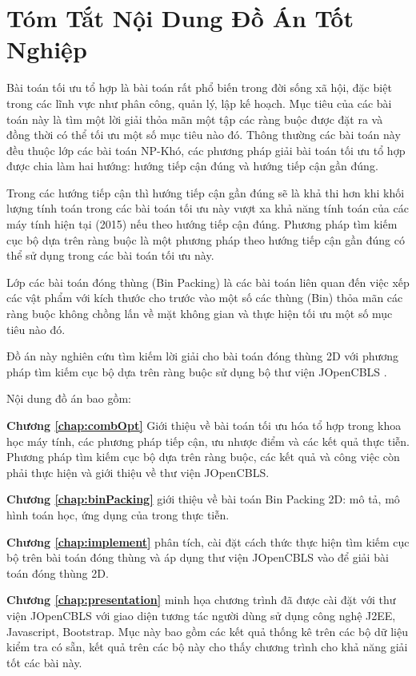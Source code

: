 \chapter*{Tóm Tắt Nội Dung Đồ Án Tốt Nghiệp}
Bài toán tối ưu tổ hợp là bài toán rất phổ biến trong đời sống xã hội, đặc biệt trong các lĩnh vực như phân công, quản lý, lập kế hoạch. Mục tiêu của các bài toán này là tìm một lời giải thỏa mãn một tập các ràng buộc được đặt ra và đồng thời có thể tối ưu một số mục tiêu nào đó. Thông thường các bài toán này đều thuộc lớp các bài toán NP-Khó, các phương pháp giải bài toán tối ưu tổ hợp được chia làm hai hướng: hướng tiếp cận đúng và hướng tiếp cận gần đúng.

Trong các hướng tiếp cận thì hướng tiếp cận gần đúng sẽ là khả thi hơn khi khối lượng tính toán trong các bài toán tối ưu này vượt xa khả năng tính toán của các máy tính hiện tại (2015) nếu theo hướng tiếp cận đúng. Phương pháp tìm kiếm cục bộ dựa trên ràng buộc là một phương pháp theo hướng tiếp cận gần đúng có thể sử dụng trong các bài toán tối ưu này.

Lớp các bài toán đóng thùng (Bin Packing) \cite{hopper2000twodimensional, lodi1999heuristic, ortmann2010newimpro, prisinger2005thetwod} là các bài toán liên quan đến việc xếp các vật phẩm với kích thước cho trước vào một số các thùng (Bin) thỏa mãn các ràng buộc không chồng lấn về mặt không gian và thực hiện tối ưu một số mục tiêu nào đó.

Đồ án này nghiên cứu tìm kiếm lời giải cho bài toán đóng thùng 2D với phương pháp tìm kiếm cục bộ dựa trên ràng buộc \cite{rossi2006handbookOfCp, pascal2005cp} sử dụng bộ thư viện JOpenCBLS \cite{dungpq2015cbls}.

Nội dung đồ án bao gồm:

\textbf{Chương \ref{chap:combOpt}} Giới thiệu về bài toán tối ưu hóa tổ hợp trong khoa học máy tính, các phương pháp tiếp cận, ưu nhược điểm và các kết quả thực tiễn. Phương pháp tìm kiếm cục bộ dựa trên ràng buộc, các kết quả và công việc còn phải thực hiện và giới thiệu về thư viện JOpenCBLS.

\textbf{Chương \ref{chap:binPacking}} giới thiệu về bài toán Bin Packing 2D: mô tả, mô hình toán học, ứng dụng của trong thực tiễn.

\textbf{Chương \ref{chap:implement}} phân tích, cài đặt cách thức thực hiện tìm kiếm cục bộ trên bài toán đóng thùng và áp dụng thư viện JOpenCBLS vào để giải bài toán đóng thùng 2D.

\textbf{Chương \ref{chap:presentation}} minh họa chương trình đã được cài đặt với thư viện JOpenCBLS với giao diện tương tác người dùng sử dụng công nghệ J2EE, Javascript, Bootstrap. Mục này bao gồm các kết quả thống kê trên các bộ dữ liệu kiểm tra có sẵn, kết quả trên các bộ này cho thấy chương trình cho khả năng giải tốt các bài này.
